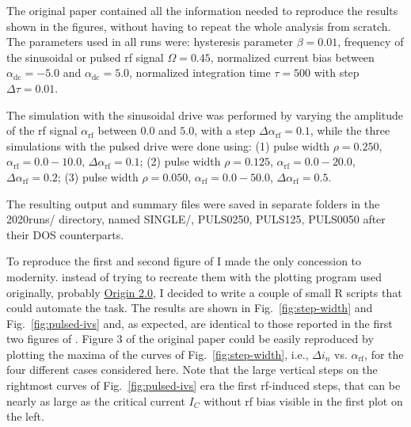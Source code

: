 The original paper  contained all the information needed to reproduce the results shown in the figures, without having to repeat the whole analysis from scratch. 
The parameters used in all runs were: hysteresis parameter $\beta = 0.01$, frequency of the sinusoidal or pulsed  rf signal $\Omega = 0.45$, normalized current bias between $\alpha_\mathrm{dc} = -5.0$ and $\alpha_\mathrm{dc} = 5.0$, normalized integration time $\tau = 500$ with step $\Delta \tau = 0.01$. 

The simulation with the sinusoidal drive was performed by varying the amplitude of the rf signal $\alpha_\mathrm{rf}$ between $0.0$ and $5.0$, with a step $\Delta \alpha_\mathrm{rf} = 0.1$, while the three simulations with the pulsed drive were done using: 
(1) pulse width $\rho = 0.250$, $\alpha_\mathrm{rf} = 0.0 - 10.0$, $\Delta \alpha_\mathrm{rf} = 0.1$;
(2) pulse width $\rho = 0.125$, $\alpha_\mathrm{rf} = 0.0 - 20.0$, $\Delta \alpha_\mathrm{rf} = 0.2$;
(3) pulse width $\rho = 0.050$, $\alpha_\mathrm{rf} = 0.0 - 50.0$, $\Delta \alpha_\mathrm{rf} = 0.5$.

The resulting output and summary files were saved in separate folders in the \textsf{2020runs/} directory, named \textsf{SINGLE/}, \textsf{PULS0250}, \textsf{PULS125}, \textsf{PULS0050} after their DOS counterparts.

To reproduce the first and second figure of \cite{Maggi:1996} I made the only concession to modernity. instead of trying to recreate them with the plotting program used originally, probably \href{https://www.originlab.com}{Origin 2.0}, I decided to write a couple of small R scripts that could automate the task.
The results are shown in Fig.~\ref{fig:step-width} and Fig.~\ref{fig:pulsed-ivs} and, as expected, are identical to those reported in the first two figures of \cite{Maggi:1996}. 
Figure 3 of the original paper could be easily reproduced by plotting the maxima of the curves of Fig.~\ref{fig:step-width}, i.e., $\Delta i_n$ vs. $\alpha_\mathrm{rf}$, for the four different cases considered here.
Note that the large vertical steps on the rightmost curves of Fig.~\ref{fig:pulsed-ivs} era the first rf-induced steps, that can be nearly as large as the critical current $I_C$ without rf bias visible in the first plot on the left.

